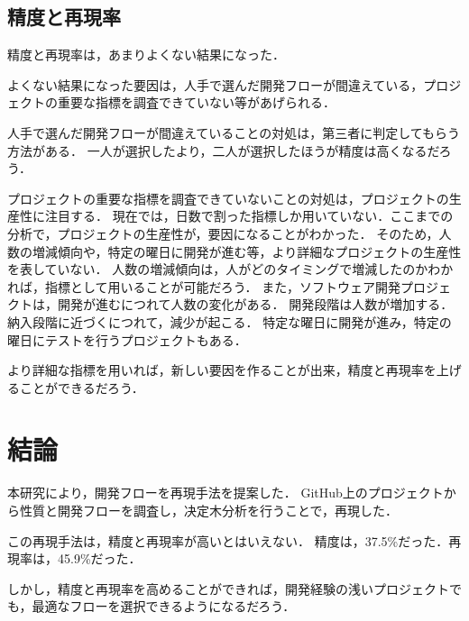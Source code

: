 \section{精度と再現率}
精度と再現率は，あまりよくない結果になった．

よくない結果になった要因は，人手で選んだ開発フローが間違えている，プロジェクトの重要な指標を調査できていない等があげられる．

人手で選んだ開発フローが間違えていることの対処は，第三者に判定してもらう方法がある．
一人が選択したより，二人が選択したほうが精度は高くなるだろう．

プロジェクトの重要な指標を調査できていないことの対処は，プロジェクトの生産性に注目する．
現在では，日数で割った指標しか用いていない．ここまでの分析で，プロジェクトの生産性が，要因になることがわかった．
そのため，人数の増減傾向や，特定の曜日に開発が進む等，より詳細なプロジェクトの生産性を表していない．
人数の増減傾向は，人がどのタイミングで増減したのかわかれば，指標として用いることが可能だろう．
また，ソフトウェア開発プロジェクトは，開発が進むにつれて人数の変化がある．
開発段階は人数が増加する．納入段階に近づくにつれて，減少が起こる．
特定な曜日に開発が進み，特定の曜日にテストを行うプロジェクトもある．

より詳細な指標を用いれば，新しい要因を作ることが出来，精度と再現率を上げることができるだろう．







\chapter{結論}
本研究により，開発フローを再現手法を提案した．
GitHub上のプロジェクトから性質と開発フローを調査し，决定木分析を行うことで，再現した．

この再現手法は，精度と再現率が高いとはいえない．
精度は，37.5\%だった．再現率は，45.9\%だった．

しかし，精度と再現率を高めることができれば，開発経験の浅いプロジェクトでも，最適なフローを選択できるようになるだろう．






